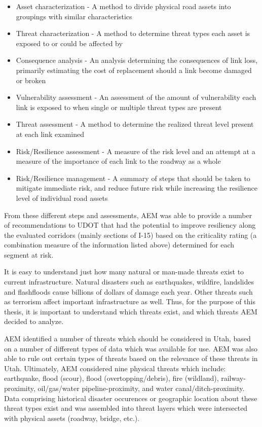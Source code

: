 \begin{itemize}
	\item Asset characterization - A method to divide physical road assets into groupings with similar characteristics
	\item Threat characterization - A method to determine threat types each asset is exposed to or could be affected by
	\item Consequence analysis - An analysis determining the consequences of link loss, primarily estimating the cost of replacement should a link become damaged or broken
	\item Vulnerability assessment - An assessment of the amount of vulnerability each link is exposed to when single or multiple threat types are present
	\item Threat assessment - A method to determine the realized threat level present at each link examined
	\item Risk/Resilience assessment - A measure of the risk level and an attempt at a measure of the importance of each link to the roadway as a whole
	\item Risk/Resilience management - A summary of steps that should be taken to mitigate immediate risk, and reduce future risk while increasing the resilience level of individual road assets
\end{itemize}

From these different steps and assessments,
AEM was able to provide a number of recommendations to UDOT that had the potential to improve
resiliency along the evaluated corridors (mainly sections of I-15)
based on the criticality rating (a combination measure of the information listed above) determined for each segment at risk.

It is easy to understand just how many natural or man-made threats exist to current infrastructure. Natural disasters such as earthquakes, wildfire, landslides and flashfloods cause billions of dollars of damage each year. Other threats such as terrorism affect important infrastructure as well. Thus, for the purpose of this thesis, it is important to understand which threats exist, and which threats AEM decided to analyze.

AEM identified a number of threats which should be considered in Utah, based on a number of different types of data which was available for use. AEM was also able to rule out certain types of threats based on the relevance of these threats in Utah. Ultimately, AEM considered nine physical threats which include: earthquake, flood (scour), flood
(overtopping/debris), fire
(wildland), railway-proximity, oil/gas/water pipeline-proximity, and water
canal/ditch-proximity. Data comprising historical disaster occurences or geographic location about these threat types exist and was assembled into threat layers which were intersected with physical assets (roadway,
bridge, etc.).

